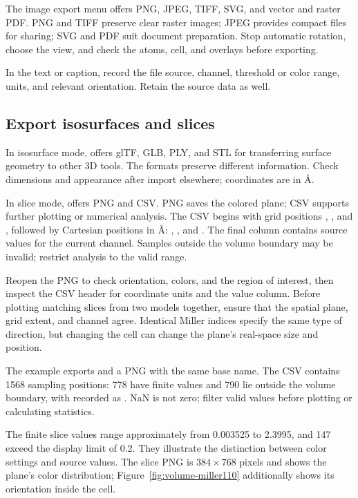The image export menu offers PNG, JPEG, TIFF, SVG, and vector and raster PDF. PNG and TIFF preserve clear raster images; JPEG provides compact files for sharing; SVG and PDF suit document preparation. Stop automatic rotation, choose the view, and check the atoms, cell, and overlays before exporting.

In the text or caption, record the file source, channel, threshold or color range, units, and relevant orientation. Retain the source data as well.

\subsection{Export isosurfaces and slices}

In isosurface mode,  offers glTF, GLB, PLY, and STL for transferring surface geometry to other 3D tools. The formats preserve different information. Check dimensions and appearance after import elsewhere; coordinates are in \AA.

In slice mode,  offers PNG and CSV. PNG saves the colored plane; CSV supports further plotting or numerical analysis. The CSV begins with grid positions , , and , followed by Cartesian positions in \AA: \mbox{}, \mbox{}, and \mbox{}. The final  column contains source values for the current channel. Samples outside the volume boundary may be invalid; restrict analysis to the valid range.

Reopen the PNG to check orientation, colors, and the region of interest, then inspect the CSV header for coordinate units and the value column. Before plotting matching slices from two models together, ensure that the spatial plane, grid extent, and channel agree. Identical Miller indices specify the same type of direction, but changing the cell can change the plane's real-space size and position.

The example exports  and a PNG with the same base name. The CSV contains 1568 sampling positions: 778 have finite values and 790 lie outside the volume boundary, with  recorded as . NaN is not zero; filter valid values before plotting or calculating statistics.

The finite slice values range approximately from 0.003525 to 2.3995, and 147 exceed the display limit of 0.2. They illustrate the distinction between color settings and source values. The slice PNG is $384\times768$ pixels and shows the plane's color distribution; Figure~\ref{fig:volume-miller110} additionally shows its orientation inside the cell.

